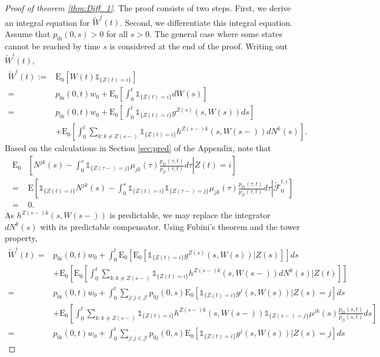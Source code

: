 \documentclass[12pt]{article}
\newcommand{\E}{\text{E}}
\newcommand{\indic}[1]{\mathds{1}_{ \{ #1 \} }}
\theoremstyle{my_thm}
\begin{document}
\begin{proof}[Proof of theorem \ref{thm:Diff_1}]
The proof consists of two steps. First, we derive an integral equation for $\tilde{W}^i(t)$. Second, we differentiate this integral equation. \\
Assume that $p_{0i}(0,s)>0$ for all $s>0$. The general case where some states cannot be reached by time $s$ is considered at the end of the proof. Writing out $\tilde{W}^i(t)$,
\begin{align*}
\tilde{W}^i(t):=&\E_0[W(t) \indic{Z(t)=i}]
\\
=&
p_{0i}(0,t)w_0+\E_0 \left[ \int_0^t \indic{Z(t)=i} dW(s) \right]
\\
=&
p_{0i}(0,t)w_0+\E_0 \left[ \int_0^t \indic{Z(t)=i} g^{Z(s)}(s,W(s))ds \right]
\\
&+
\E_0 \left[ \int_0^t \sum_{k:k \neq Z(s-)} \indic{Z(t)=i} h^{Z(s-)k}(s,W(s-)) dN^k(s)  \right].
\end{align*}
Based on the calculations in Section \ref{sec:pred} of the Appendix, note that 
\begin{align*}
\E_0 & \left. \left[ N^{jk}(s) - \int_0^s \indic{Z(\tau-)=j} \mu_{jk}(\tau)\frac{p_{ki}(\tau,t)}{p_{ji}(\tau,t)} d\tau \right| Z(t)=i \right] 
\\
=&
\E \left. \left[ \indic{Z(t)=i}N^{jk}(s) - \int_0^s \indic{Z(t)=i} \indic{Z(\tau-)=j} \mu_{jk}(\tau)\frac{p_{ki}(\tau,t)}{p_{ji}(\tau,t)} d\tau \right| \tilde{\mathcal{F}}_0^{t,i} \right]  
\\
=& 0.
\end{align*}
As $h^{Z(s-)k}(s,W(s-))$ is predictable, we may replace the integrator $dN^k(s)$ with its predictable compensator. Using Fubini's theorem and the tower property,
\begin{align}
\tilde{W}^i(t)=& p_{0i}(0,t)w_0+
\nonumber \int_0^t \E_0 \left[ \E_0 \left[ \indic{Z(t)=i} g^{Z(s)}(s,W(s))|Z(s) \right]\right] ds
\\
&+
\nonumber \E_0 \left[ \E_0 \left[ \int_0^t \sum_{k:k \neq Z(s-)}\indic{Z(t)=i} h^{Z(s-)k}(s,W(s-)) dN^k(s) |Z(t) \right] \right] 
\\
=&
 p_{0i}(0,t)w_0+
\nonumber \int_0^t \sum_{j:j \in \mathcal{J}} p_{0j}(0,s) \E_0 \left[ \indic{Z(t)=i} g^{j}(s,W(s))|Z(s)=j \right]  ds
\\
&+
\nonumber \E_0 \left[ \int_0^t \sum_{k:k \neq Z(s-)}\indic{Z(t)=i} h^{Z(s-)k}(s,W(s-)) \indic{Z(s-)=j} \mu^{jk}(s) \frac{p_{ki}(s,t)}{p_{ji}(s,t)}ds \right] 
\\
=&
p_{0i}(0,t)w_0+
\nonumber \int_0^t \sum_{j:j \in \mathcal{J}} p_{0j}(0,s) \E_0 \left[ \indic{Z(t)=i} g^{j}(s,W(s))|Z(s)=j \right] ds

\end{align}
\end{proof}
\end{document}
